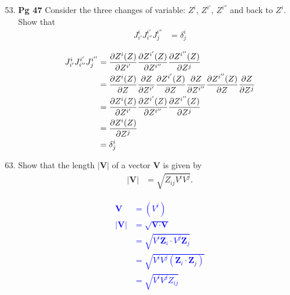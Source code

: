 \documentclass[12pt,a4paper]{report}
\newcommand{\BLUE}[1]{\textcolor{blue}{#1}}
\newcommand{\VK}[1]{\textbf{#1}}
\begin{document}
\begin{enumerate}[label=\textbf{4.\arabic*}]
\setcounter{enumi}{52}
	
	\newcommand{\JJJ}[2]{J^{#1}_{#2}}
	\newcommand{\JJJJ}[2]{\frac{\partial Z^{#1}(Z)}{\partial Z^{#2}}}
	\item \textbf{Pg 47} Consider the three changes of variable: $Z^i$, $Z^{i'}$, $Z^{i''}$ and back to $Z^i$.  Show that
	\begin{align*}
		\JJJ{i}{i'}\JJJ{i'}{i''}\JJJ{i''}{j}	&= \delta^i_j
	\end{align*}
	
	\BLUE{\begin{align*}
		\JJJ{i}{i'}\JJJ{i'}{i''}\JJJ{i''}{j}	&= \JJJJ{i}{i'}\JJJJ{i'}{i''}\JJJJ{i''}{j} \\
		&= \JJJJ{i}{}\PART{Z}{Z^{i'}}\JJJJ{i'}{}\PART{Z}{Z^{i''}}\JJJJ{i''}{}\PART{Z}{Z^j} \\
		&= \PART{Z^i(Z)}{Z^{i'}}\PART{Z^{i'}(Z)}{Z^{i''}}\PART{Z^{i''}(Z)}{Z^{j}} \\
		&= \PART{Z^i(Z)}{Z^{j}} \\
		&=  \delta^i_j
	\end{align*}
	}

\end{enumerate}

\HLINE
\begin{enumerate}[label=\textbf{5.\arabic*}]
\setcounter{enumi}{62}


\item Show that the length $|\VK{V}|$ of a vector $\VK{V}$ is given by \begin{align*}
	|\VK{V}| &= \sqrt{Z_{ij}V^iV^j}.
\end{align*}

\BLUE{\begin{align*}
	\VK{V} &= (V^i) \\
	|\VK{V}| &= \sqrt{\VK{V}\cdot\VK{V}} \\
	&= \sqrt{V^i\VK{Z}_i\cdot V^j\VK{Z}_j}\\
	&= \sqrt{V^iV^j(\VK{Z}_i\cdot \VK{Z}_j)}\\
	&= \sqrt{V^iV^j Z_{ij}}
\end{align*}
}

\end{enumerate}
\end{document}
